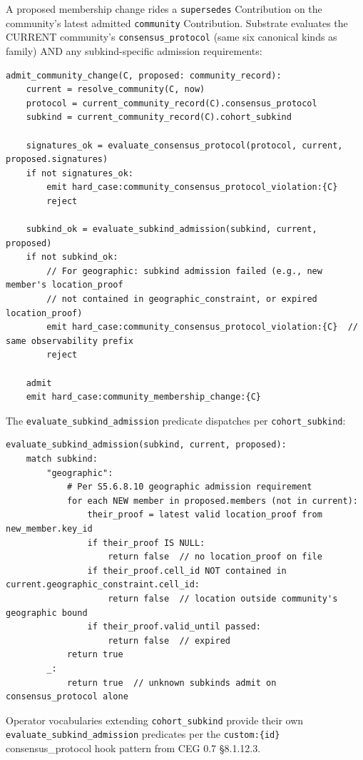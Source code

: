 \documentclass[11pt]{article}
\begin{document}
A proposed membership change rides a \texttt{supersedes} Contribution on the community's latest admitted \texttt{community} Contribution. Substrate evaluates the CURRENT community's \texttt{consensus\_protocol} (same six canonical kinds as family) AND any subkind-specific admission requirements:


\begin{lstlisting}
admit_community_change(C, proposed: community_record):
    current = resolve_community(C, now)
    protocol = current_community_record(C).consensus_protocol
    subkind = current_community_record(C).cohort_subkind

    signatures_ok = evaluate_consensus_protocol(protocol, current, proposed.signatures)
    if not signatures_ok:
        emit hard_case:community_consensus_protocol_violation:{C}
        reject

    subkind_ok = evaluate_subkind_admission(subkind, current, proposed)
    if not subkind_ok:
        // For geographic: subkind admission failed (e.g., new member's location_proof
        // not contained in geographic_constraint, or expired location_proof)
        emit hard_case:community_consensus_protocol_violation:{C}  // same observability prefix
        reject

    admit
    emit hard_case:community_membership_change:{C}
\end{lstlisting}

The \texttt{evaluate\_subkind\_admission} predicate dispatches per \texttt{cohort\_subkind}:


\begin{lstlisting}
evaluate_subkind_admission(subkind, current, proposed):
    match subkind:
        "geographic":
            # Per S5.6.8.10 geographic admission requirement
            for each NEW member in proposed.members (not in current):
                their_proof = latest valid location_proof from new_member.key_id
                if their_proof IS NULL:
                    return false  // no location_proof on file
                if their_proof.cell_id NOT contained in current.geographic_constraint.cell_id:
                    return false  // location outside community's geographic bound
                if their_proof.valid_until passed:
                    return false  // expired
            return true
        _:
            return true  // unknown subkinds admit on consensus_protocol alone
\end{lstlisting}

Operator vocabularies extending \texttt{cohort\_subkind} provide their own \texttt{evaluate\_subkind\_admission} predicates per the \texttt{custom:\{id\}} consensus\_protocol hook pattern from CEG 0.7 §8.1.12.3.
\end{document}
